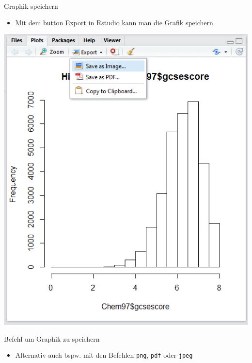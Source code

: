 \documentclass[ignorenonframetext,]{beamer}
\newenvironment{Shaded}{}{}
\newcommand{\KeywordTok}[1]{\textcolor[rgb]{0.00,0.44,0.13}{\textbf{{#1}}}}
\newcommand{\StringTok}[1]{\textcolor[rgb]{0.25,0.44,0.63}{{#1}}}
\newcommand{\NormalTok}[1]{{#1}}
\providecommand{\tightlist}{%
\setlength{\itemsep}{0pt}\setlength{\parskip}{0pt}}
\begin{document}
\begin{frame}{Graphik speichern}

\begin{itemize}
\tightlist
\item
  Mit dem button Export in Rstudio kann man die Grafik speichern.
\end{itemize}

\includegraphics{./tex2pdf.956/c841157f024cc7a3d01009eeb5c876036fad5d81.png}

\end{frame}

\begin{frame}[fragile]{Befehl um Graphik zu speichern}

\begin{itemize}
\tightlist
\item
  Alternativ auch bspw. mit den Befehlen \texttt{png}, \texttt{pdf} oder
  \texttt{jpeg}
\end{itemize}

\begin{Shaded}
\end{Shaded}

\end{frame}
\end{document}
